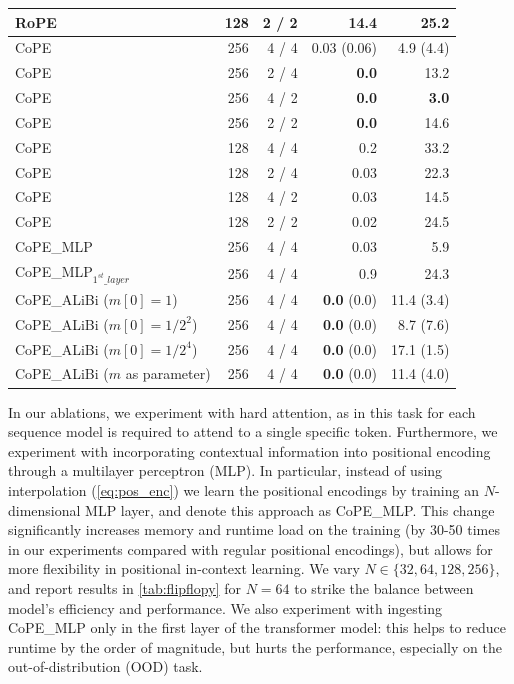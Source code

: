 \documentclass{article}
\newcommand{\ours}{CoPE\xspace}
\newcommand{\std}[1]{\small (#1)}
\begin{document}
\begin{table}[t]
\begin{tabular}{lrrrr}
    RoPE & 128 & 2 / 2 & 14.4 & 25.2 \\
    \midrule
    \ours & 256 & 4 / 4 & 0.03 \std{0.06} & 4.9 \std{4.4} \\
    \ours & 256 & 2 / 4 & \textbf{0.0} & 13.2\\
    \ours & 256 & 4 / 2 & \textbf{0.0} & \textbf{3.0} \\
    \ours & 256 & 2 / 2 & \textbf{0.0} & 14.6 \\
    \ours & 128 & 4 / 4 & 0.2 & 33.2 \\
    \ours & 128 & 2 / 4 & 0.03 & 22.3\\
    \ours & 128 & 4 / 2 & 0.03 & 14.5\\
    \ours & 128 & 2 / 2 & 0.02 & 24.5\\
    \midrule
    \ours\_MLP & 256 & 4 / 4 & 0.03 & 5.9 \\
    \ours\_MLP$_{1^{st}\_layer}$ & 256 & 4 / 4 & 0.9 & 24.3 \\
    \midrule
    \ours\_ALiBi ($m[0]=1$) & 256 & 4 / 4 & {\bf 0.0} \std{0.0} & 11.4 \std{3.4} \\
    \ours\_ALiBi ($m[0]=1/2^2$) & 256 & 4 / 4 & {\bf 0.0} \std{0.0} & 8.7 \std{7.6}  \\
    \ours\_ALiBi ($m[0]=1/2^4$) & 256 & 4 / 4 & {\bf 0.0} \std{0.0} & 17.1 \std{1.5} \\
    \ours\_ALiBi ($m$ as parameter) & 256 & 4 / 4 & {\bf 0.0} \std{0.0} & 11.4 \std{4.0} \\
    \bottomrule
  \end{tabular}
\end{table}

In our ablations, we experiment with hard attention, as in this task for each sequence model is required to attend to a single specific token. Furthermore, we experiment with incorporating contextual information into positional encoding through a multilayer perceptron (MLP). In particular, instead of using interpolation (\cref{eq:pos_enc}) we learn the positional encodings by training an $N$-dimensional MLP layer, and denote this approach as \ours\_MLP. This change significantly increases memory and runtime load on the training (by 30-50 times in our experiments compared with regular positional encodings), but allows for more flexibility in positional in-context learning. We vary $N\in\{32, 64, 128, 256\}$, and report results in \cref{tab:flipflopy} for $N=64$ to strike the balance between model's efficiency and performance. We also experiment with ingesting \ours\_MLP only in the first layer of the transformer model: this helps to reduce runtime by the order of magnitude, but hurts the performance, especially on the out-of-distribution (OOD) task.
\end{document}
